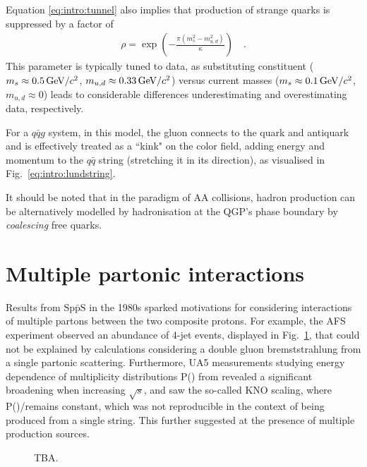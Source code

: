 Equation \ref{eq:intro:tunnel} also implies that production of strange quarks is suppressed by a factor of 
\begin{align}
\rho = \exp \left( -\frac{\pi (m^2_s - m^2_{u,d})}{\kappa} \right) \quad .
\end{align}
This parameter is typically tuned to data, as substituting constituent ($m_s \approx 0.5 \text{\,GeV/$c^2$}$, $m_{u,d} \approx 0.33 \text{\,GeV/$c^2$}$) versus current masses ($m_s \approx 0.1 \text{\,GeV/$c^2$}$, $m_{u,d} \approx 0$) leads to considerable differences underestimating and overestimating data, respectively.

For a $q\bar{q}g$ system, in this model, the gluon connects to the quark and antiquark and is effectively treated as a ``kink" on the color field, adding energy and momentum to the $q\bar{q}$ string (stretching it in its direction), as visualised in Fig.~\ref{eq:intro:lundstring}.

It should be noted that in the paradigm of AA collisions, hadron production can be alternatively modelled by hadronisation at the QGP's phase boundary by \textit{coalescing} free quarks.


\section{Multiple partonic interactions}

Results from $\mathrm{Sp\bar{p}S}$ in the 1980s sparked motivations for considering interactions of multiple partons between the two composite protons. For example, the AFS experiment observed an abundance of 4-jet events, displayed in Fig.~\ref{fig:intro:afs4jet}, that could not be explained by calculations considering a double gluon bremststrahlung from a single partonic scattering\cite{afs-4jet}. Furthermore, UA5 measurements studying energy dependence of multiplicity distributions P(\Nch) from  revealed a significant broadening when increasing $\sqrt{s}$, and saw the so-called KNO scaling\cite{kno-scaling}, where P(\Nch)/\meanNch remains constant, which was not reproducible in the context of \Nch being produced from a single string\cite{ua5-broadening}. This further suggested at the presence of multiple production sources.

\begin{figure}[H]
\caption{TBA.}
\label{fig:intro:afs4jet}
\end{figure}

